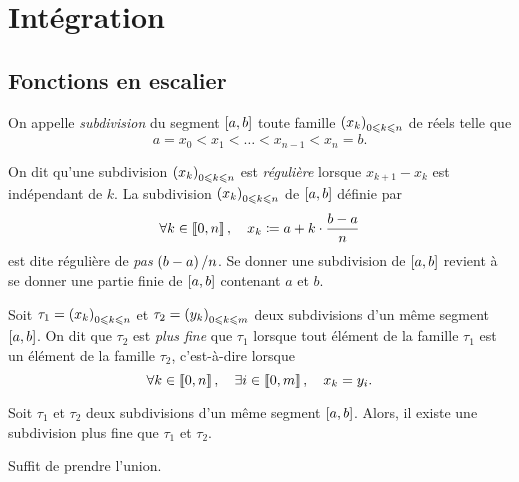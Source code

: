 \documentclass{magnolia}
\begin{document}
\magtoc

\section{Intégration}



\subsection{Fonctions en escalier}


\begin{definition}[utile=-3]
On appelle \emph{subdivision} du segment $\left[a,b\right]$ toute famille
$\left(x_k\right)_{0\leqslant k\leqslant n}$ de réels telle que
\[a=x_0<x_1<\dots<x_{n-1}<x_n=b.\]
\end{definition}
\begin{remarques}
\remarque[utile=-3] On dit qu'une subdivision $\left(x_k\right)_{0\leqslant k\leqslant n}$ est \emph{régulière}
  lorsque $x_{k+1}-x_k$ est indépendant de $k$. La subdivision
  $\left(x_k\right)_{0\leqslant k\leqslant n}$ de $\left[a,b\right]$ définie par
  \[\forall k\in\left\llbracket 0,n\right\rrbracket ,\quad x_k\coloneqq a+k\cdot\frac{b-a}{n}\]
  est dite régulière de \emph{pas} $\left(b-a\right)/n$.
\remarque[utile=-1] Se donner une subdivision de $\left[a,b\right]$ revient à se donner
  une partie finie de $\left[a,b\right]$ contenant $a$ et $b$.
\end{remarques}


\begin{definition}[utile=-1]
Soit $\tau_1=\left(x_k\right)_{0\leqslant k\leqslant n}$ et $\tau_2=\left(y_k\right)_{0\leqslant k\leqslant m}$ deux
subdivisions d'un même segment $\left[a,b\right]$. On dit que $\tau_2$ est \emph{plus
fine} que $\tau_1$ lorsque tout élément de la famille $\tau_1$ est un élément de la
famille $\tau_2$, c'est-à-dire lorsque
\[\forall k\in\left\llbracket 0,n\right\rrbracket ,\quad \exists i\in\left\llbracket 0,m\right\rrbracket ,\quad
  x_k=y_i.\]
\end{definition}


\begin{proposition}[utile=-1]
Soit $\tau_1$ et $\tau_2$ deux subdivisions d'un même segment $\left[a,b\right]$.
Alors, il existe une subdivision plus fine que $\tau_1$ et $\tau_2$.
\end{proposition}

\begin{preuve}
Suffit de prendre l'union.
\end{preuve}
\end{document}
